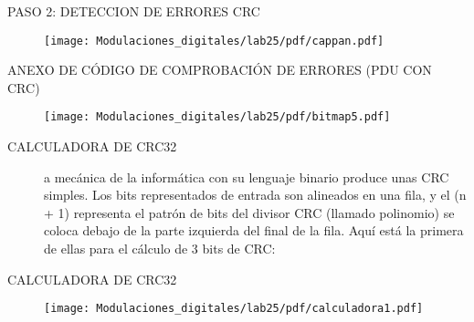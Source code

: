 \begin{frame}{PASO 2: DETECCION DE ERRORES CRC}

\begin{figure}[H]
\centering
\vspace{-3mm}
\texttt{[image: Modulaciones\_digitales/lab25/pdf/cappan.pdf]}
\end{figure}

\end{frame}

\begin{frame}{ANEXO DE CÓDIGO DE COMPROBACIÓN DE ERRORES (PDU CON CRC)}

\begin{figure}[H]
\centering
\vspace{-3mm}
\texttt{[image: Modulaciones\_digitales/lab25/pdf/bitmap5.pdf]}
\end{figure}

\end{frame}
\begin{frame}{CALCULADORA DE CRC32}


\begin{description}

    \item[] a mecánica de la informática con su lenguaje binario produce unas
CRC simples. Los bits representados de entrada son alineados en una fila, y el
(n + 1) representa el patrón de bits del divisor CRC (llamado polinomio) se
coloca debajo de la parte izquierda del final de la fila. Aquí está la primera
de ellas para el cálculo de 3 bits de CRC:\\ \vspace{2mm}

\end{description}
\end{frame}
\begin{frame}{CALCULADORA DE CRC32}


\begin{figure}[H]
\centering
\vspace{-3mm}
\texttt{[image: Modulaciones\_digitales/lab25/pdf/calculadora1.pdf]}
\end{figure}

\end{frame}
